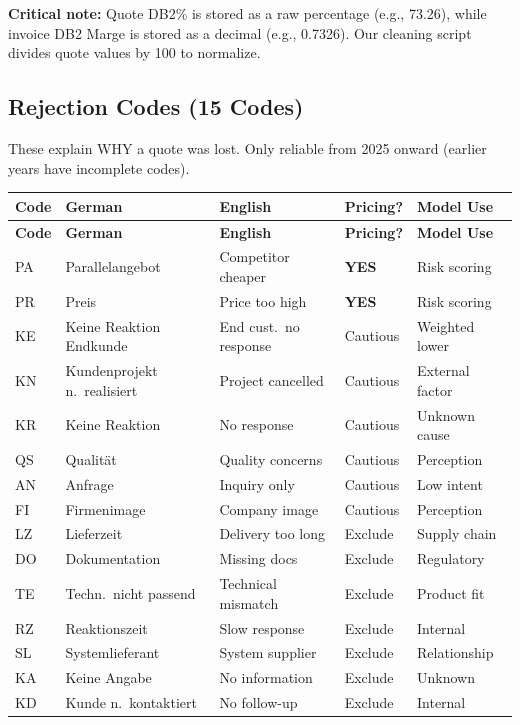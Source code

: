\documentclass[11pt,a4paper]{article}
\begin{document}
\textbf{Critical note:} Quote DB2\% is stored as a raw percentage (e.g., 73.26), while invoice DB2 Marge is stored as a decimal (e.g., 0.7326). Our cleaning script divides quote values by 100 to normalize.

\subsection{Rejection Codes (15 Codes)}

These explain WHY a quote was lost. Only reliable from 2025 onward (earlier years have incomplete codes).

\begin{longtable}{l l l l l}
\toprule
\textbf{Code} & \textbf{German} & \textbf{English} & \textbf{Pricing?} & \textbf{Model Use} \\
\midrule
\endfirsthead
\toprule
\textbf{Code} & \textbf{German} & \textbf{English} & \textbf{Pricing?} & \textbf{Model Use} \\
\midrule
\endhead
PA & Parallelangebot & Competitor cheaper & \textbf{YES} & Risk scoring \\
PR & Preis & Price too high & \textbf{YES} & Risk scoring \\
KE & Keine Reaktion Endkunde & End cust.\ no response & Cautious & Weighted lower \\
KN & Kundenprojekt n.\ realisiert & Project cancelled & Cautious & External factor \\
KR & Keine Reaktion & No response & Cautious & Unknown cause \\
QS & Qualit\"at & Quality concerns & Cautious & Perception \\
AN & Anfrage & Inquiry only & Cautious & Low intent \\
FI & Firmenimage & Company image & Cautious & Perception \\
LZ & Lieferzeit & Delivery too long & Exclude & Supply chain \\
DO & Dokumentation & Missing docs & Exclude & Regulatory \\
TE & Techn.\ nicht passend & Technical mismatch & Exclude & Product fit \\
RZ & Reaktionszeit & Slow response & Exclude & Internal \\
SL & Systemlieferant & System supplier & Exclude & Relationship \\
KA & Keine Angabe & No information & Exclude & Unknown \\
KD & Kunde n.\ kontaktiert & No follow-up & Exclude & Internal \\
\bottomrule
\end{longtable}
\end{document}
